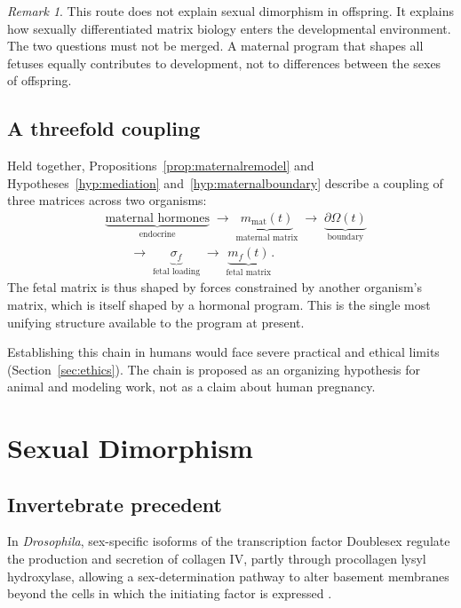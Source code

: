 \documentclass[11pt,a4paper]{article}
\theoremstyle{plain}
\theoremstyle{definition}
\theoremstyle{remark}
\newtheorem{remark}{Remark}[section]
\begin{document}
\begin{remark}
This route does not explain sexual dimorphism in offspring. It explains how sexually differentiated matrix biology enters the developmental environment. The two questions must not be merged. A maternal program that shapes all fetuses equally contributes to development, not to differences between the sexes of offspring.
\end{remark}

\subsection{A threefold coupling}

Held together, Propositions~\ref{prop:maternalremodel} and Hypotheses~\ref{hyp:mediation} and~\ref{hyp:maternalboundary} describe a coupling of three matrices across two organisms:
\begin{align*}
&\underbrace{\text{maternal hormones}}_{\text{endocrine}}
\;\to\;
\underbrace{m_{\mathrm{mat}}(t)}_{\text{maternal matrix}}
\;\to\;
\underbrace{\partial\Omega(t)}_{\text{boundary}}\\
&\qquad\to\;
\underbrace{\sigma_f}_{\text{fetal loading}}
\;\to\;
\underbrace{m_f(t)}_{\text{fetal matrix}}.
\end{align*}
The fetal matrix is thus shaped by forces constrained by another organism's matrix, which is itself shaped by a hormonal program. This is the single most unifying structure available to the program at present.

\begin{caution}
Establishing this chain in humans would face severe practical and ethical limits (Section~\ref{sec:ethics}). The chain is proposed as an organizing hypothesis for animal and modeling work, not as a claim about human pregnancy.
\end{caution}

\section{Sexual Dimorphism}\label{sec:dimorphism}

\subsection{Invertebrate precedent}

In \emph{Drosophila}, sex-specific isoforms of the transcription factor Doublesex regulate the production and secretion of collagen IV, partly through procollagen lysyl hydroxylase, allowing a sex-determination pathway to alter basement membranes beyond the cells in which the initiating factor is expressed \cite{peng2022}.
\end{document}
